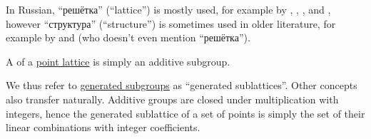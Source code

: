 \begin{remark}
\begin{itemize}
    In Russian, \enquote{решётка} (\enquote{lattice}) is mostly used, for example by
    \cite[127]{Гуров2013ТеорияРешёток},
    \cite[129]{Мальцев1970АлгебраическиеСистемы},
    \cite[\S 2.1.2]{КусраевКутателадзе2005БулевозначныйАнализ},
    \cite[212]{БелоусовТкачёв2004ДискретнаяМатематика} and
    \cite[360]{КанторовичАкилов1984ФункциональныйАнализ},
    however \enquote{структура} (\enquote{structure}) is sometimes used in older literature, for example by
    \cite[16]{Владимиров1969БулевыАлгебры}
    \cite[58]{Ляпин1960Полугруппы} and
    \cite[178]{Курош1973ОбщаяАлгебра} (who doesn't even mention \enquote{решётка}).
  \end{itemize}
\end{remark}

\begin{definition}\label{def:point_sublattice}\mimprovised
  A  of a \hyperref[def:point_lattice]{point lattice} is simply an additive subgroup.
\end{definition}
\begin{comments}
  \item We thus refer to \hyperref[def:group/generated]{generated subgroups} as \enquote{generated sublattices}. Other concepts also transfer naturally. Additive groups are closed under multiplication with integers, hence the generated sublattice of a set of points is simply the set of their linear combinations with integer coefficients.
\end{comments}

